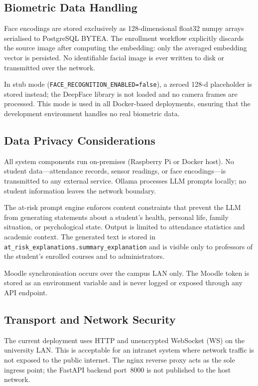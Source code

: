 \subsection{Biometric Data Handling}
\label{subsec:biometrics}

Face encodings are stored exclusively as 128-dimensional float32 numpy
arrays serialised to PostgreSQL BYTEA.  The enrollment workflow
explicitly discards the source image after computing the embedding: only
the averaged embedding vector is persisted.  No identifiable facial
image is ever written to disk or transmitted over the network.

In stub mode (\texttt{FACE\_RECOGNITION\_ENABLED=false}), a
zeroed 128-d placeholder is stored instead; the DeepFace library is not
loaded and no camera frames are processed.  This mode is used in all
Docker-based deployments, ensuring that the development environment
handles no real biometric data.

\subsection{Data Privacy Considerations}
\label{subsec:privacy}

All system components run on-premises (Raspberry Pi or Docker host).
No student data---attendance records, sensor readings, or face
encodings---is transmitted to any external service.  Ollama processes
LLM prompts locally; no student information leaves the network boundary.

The at-risk prompt engine enforces content constraints that prevent the
LLM from generating statements about a student's health, personal life,
family situation, or psychological state.  Output is limited to
attendance statistics and academic context.  The generated text is
stored in \texttt{at\_risk\_explanations.summary\_explanation} and is
visible only to professors of the student's enrolled courses and to
administrators.

Moodle synchronisation occurs over the campus LAN only.  The Moodle
token is stored as an environment variable and is never logged or
exposed through any API endpoint.

\subsection{Transport and Network Security}
\label{subsec:transport}

The current deployment uses HTTP and unencrypted WebSocket (WS) on the
university LAN.  This is acceptable for an intranet system where network
traffic is not exposed to the public internet.  The nginx reverse proxy
acts as the sole ingress point; the FastAPI backend port~8000 is not
published to the host network.

